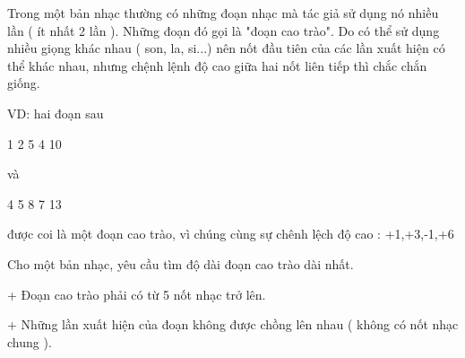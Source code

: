Trong một bản nhạc thường có những đoạn nhạc mà tác giả sử dụng nó nhiều lần ( ít nhất 2 lần ). Những đoạn đó gọi là "đoạn cao trào". Do có thể sử dụng nhiều giọng khác nhau ( son, la, si...) nên nốt đầu tiên của các lần xuất hiện có thể khác nhau, nhưng chệnh lệnh độ cao giữa hai nốt liên tiếp thì chắc chắn giống.   


   VD: hai đoạn sau   


   1 2 5 4 10   


   và   


   4 5 8 7 13   


   được coi là một đoạn cao trào, vì chúng cùng sự chênh lệch độ cao : +1,+3,-1,+6   


   Cho một bản nhạc, yêu cầu tìm độ dài đoạn cao trào dài nhất.   


   + Đoạn cao trào phải có từ 5 nốt nhạc trở lên.   


   + Những lần xuất hiện của đoạn không được chồng lên nhau ( không có nốt nhạc chung ).
